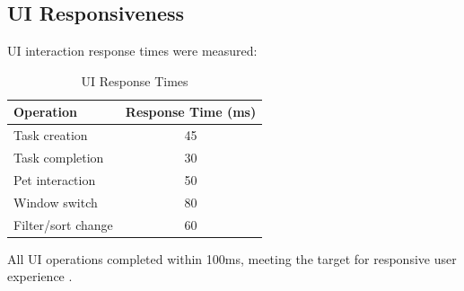 \subsection{UI Responsiveness}

UI interaction response times were measured:

\begin{table}[htbp]
\centering
\caption{UI Response Times}
\label{tab:ui-response}
\begin{tabular}{@{}lc@{}}
\toprule
\textbf{Operation} & \textbf{Response Time (ms)} \\
\midrule
Task creation & 45 \\
Task completion & 30 \\
Pet interaction & 50 \\
Window switch & 80 \\
Filter/sort change & 60 \\
\bottomrule
\end{tabular}
\end{table}

All UI operations completed within 100ms, meeting the target for responsive user experience \citep{nielsen1993usability}.

